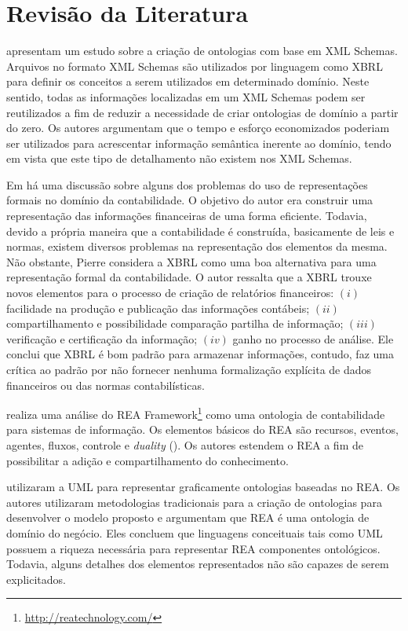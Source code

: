 \documentclass[msc,proposal,hidelot,hideabstract]{ppgccufmg} %
\begin{document}
\chapter{Revisão da Literatura}
\label{ch:revisao}

\cite{Bosch:2013:APD:2575980.2575988} apresentam um estudo sobre a criação de ontologias com base em XML Schemas. Arquivos no formato XML Schemas são utilizados por linguagem como XBRL para definir os conceitos a serem utilizados em determinado domínio. Neste sentido, todas as informações localizadas em um XML Schemas podem ser reutilizados a fim de reduzir a necessidade de criar ontologias de domínio a partir do zero. Os autores argumentam que o tempo e esforço economizados poderiam ser utilizados para acrescentar informação semântica inerente ao domínio, tendo em vista que este tipo de detalhamento não existem nos XML Schemas.

Em \cite{journals/ijcsa/Pierre08} há uma discussão sobre alguns dos problemas do uso de representações formais no domínio da contabilidade. O objetivo do autor era construir uma representação das informações financeiras de uma forma eficiente. Todavia, devido a própria maneira que a contabilidade é construída, basicamente de leis e normas, existem diversos problemas na representação dos elementos da mesma. Não obstante, Pierre considera a XBRL como uma boa alternativa para uma representação formal da contabilidade. O autor ressalta que a XBRL trouxe novos elementos para o processo de criação de relatórios financeiros: $(i)$ facilidade na produção e publicação das informações contábeis; $(ii)$ compartilhamento e possibilidade comparação partilha de informação; $(iii)$ verificação e certificação da informação; $(iv)$ ganho no processo de análise. Ele conclui que XBRL é bom padrão para armazenar informações, contudo, faz uma crítica ao padrão por não fornecer nenhuma formalização explícita de dados financeiros ou das normas contabilísticas.

\cite{lupacsc2010role} realiza uma análise do REA Framework\footnote{\url{http://reatechnology.com/}} como uma ontologia de contabilidade para sistemas de informação. Os elementos básicos do REA são recursos, eventos, agentes, fluxos, controle e \textit{duality} (\cite{mccarthy1982rea}). Os autores estendem o REA a fim de possibilitar a adição e compartilhamento do conhecimento.

\cite{gailly2007positioning} utilizaram a UML para representar graficamente ontologias baseadas no REA. Os autores utilizaram metodologias tradicionais para a criação de ontologias para desenvolver o modelo proposto e argumentam que REA é uma ontologia de domínio do negócio. Eles concluem que linguagens conceituais tais como UML possuem a riqueza necessária para representar REA componentes ontológicos. Todavia, alguns detalhes dos elementos representados não são capazes de serem explicitados.
\end{document}
